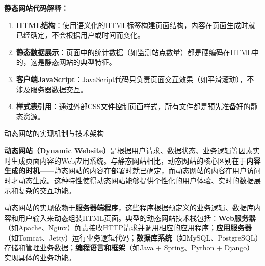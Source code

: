 \textbf{静态网站代码解释：}

\begin{enumerate}
\def\labelenumi{\arabic{enumi}.}
\item
  \textbf{HTML结构}：使用语义化的HTML标签构建页面结构，内容在页面生成时就已经确定，不会根据用户或时间而变化。
\item
  \textbf{静态数据展示}：页面中的统计数据（如监测站点数量）都是硬编码在HTML中的，这是静态网站的典型特征。
\item
  \textbf{客户端JavaScript}：JavaScript代码只负责页面交互效果（如平滑滚动），不涉及服务器数据交互。
\item
  \textbf{样式表引用}：通过外部CSS文件控制页面样式，所有文件都是预先准备好的静态资源。
\end{enumerate}

 动态网站的实现机制与技术架构

\textbf{动态网站（Dynamic Website）}是根据用户请求、数据状态、业务逻辑等因素实时生成页面内容的Web应用系统。与静态网站相比，动态网站的核心区别在于\textbf{内容生成的时机}------静态网站的内容在部署时就已确定，而动态网站的内容在用户访问时才动态生成。这种特性使得动态网站能够提供个性化的用户体验、实时的数据展示和复杂的交互功能。

动态网站的实现依赖于\textbf{服务器端程序}，这些程序根据预定义的业务逻辑、数据库内容和用户输入来动态组装HTML页面。典型的动态网站技术栈包括：\textbf{Web服务器}（如Apache、Nginx）负责接收HTTP请求并调用相应的应用程序；\textbf{应用服务器}（如Tomcat、Jetty）运行业务逻辑代码；\textbf{数据库系统}（如MySQL、PostgreSQL）存储和管理业务数据；\textbf{编程语言和框架}（如Java + Spring、Python + Django）实现具体的业务功能。

